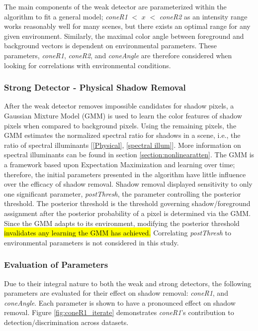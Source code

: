 \documentclass[12pt]{report}
\begin{document}
The main components of the weak detector are parameterized within the algorithm to fit a general model; \textit{coneR1} $<$ $x$ $<$ \textit{coneR2} as an intensity range works reasonably well for many scenes, but there exists an optimal range for any given environment. Similarly, the maximal color angle between foreground and background vectors is dependent on environmental parameters. These parameters, \textit{coneR1}, \textit{coneR2}, and \textit{coneAngle} are therefore considered when looking for correlations with environmental conditions.

\subsubsection{Strong Detector - Physical Shadow Removal}

After the weak detector removes impossible candidates for shadow pixels, a Gaussian Mixture Model (GMM) is used to learn the color features of shadow pixels when compared to background pixels. Using the remaining pixels, the GMM estimates the normalized spectral ratio for shadows in a scene, i.e., the ratio of spectral illuminants [\ref{Physical}, \ref{spectral illum}]. More information on spectral illuminants can be found in section \ref{section:nonlinearatten}. The GMM is a framework based upon Expectation Maximization and learning over time; therefore, the initial parameters presented in the algorithm have little influence over the efficacy of shadow removal. Shadow removal displayed sensitivity to only one significant parameter, \textit{postThresh}, the parameter controlling the posterior threshold. The posterior threshold is the threshold governing shadow/foreground assignment after the posterior probability of a pixel is determined via the GMM. Since the GMM adapts to its environment, modifying the posterior threshold \hl{invalidates any learning the GMM has achieved.} Correlating \textit{postThresh} to environmental parameters is not considered in this study.

\subsubsection{Evaluation of Parameters}

Due to their integral nature to both the weak and strong detectors, the following parameters are evaluated for their effect on shadow removal: \textit{coneR1}, and \textit{coneAngle}. Each parameter is shown to have a pronounced effect on shadow removal. Figure \ref{fig:coneR1_iterate} demonstrates \textit{coneR1}'s contribution to detection/discrimination across datasets.
\end{document}
